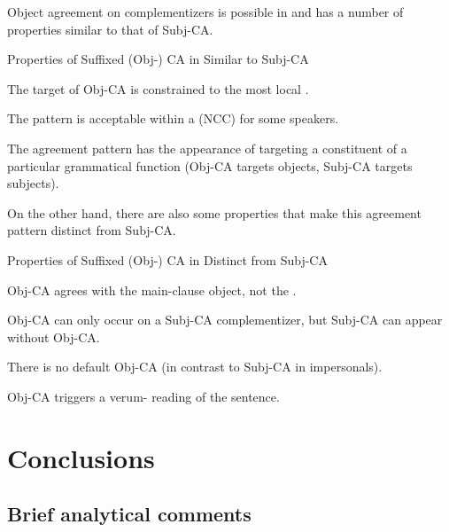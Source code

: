 \documentclass[output=paper
,newtxmath
,modfonts
,nonflat]{langsci/langscibook}
\begin{document}
Object agreement on complementizers is possible in  and has a number of properties similar to that of Subj-CA.
\newpage
\begin{exe}
\ex Properties of Suffixed (Obj-) CA in  Similar to Subj-CA
\begin{xlist}

\ex The target of Obj-CA is constrained to the most local . 


\ex The pattern is acceptable within a  (NCC) for some speakers.

\ex The agreement pattern has the appearance of targeting a constituent of a particular grammatical function (Obj-CA targets objects, Subj-CA targets subjects).

\end{xlist}
\end{exe}

\noindent On the other hand, there are also some properties that make this agreement pattern distinct from Subj-CA.

\begin{exe}
\ex Properties of Suffixed (Obj-) CA in  Distinct from Subj-CA
\begin{xlist}

\ex Obj-CA agrees with the main-clause object, not the . 

\ex Obj-CA can only occur on a Subj-CA complementizer, but Subj-CA can appear without Obj-CA. 

\ex There is no default Obj-CA (in contrast to Subj-CA in impersonals). 

\ex Obj-CA triggers a verum- reading of the sentence. 

\end{xlist}
\end{exe}




\section{Conclusions} \label{Conclusions}

\subsection{Brief analytical comments}
\end{document}
